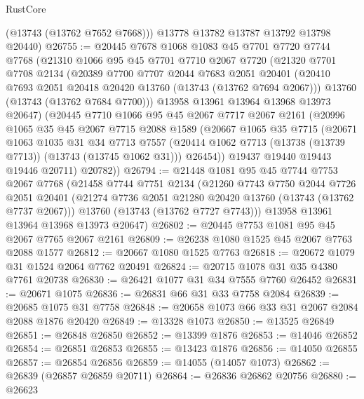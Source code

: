 \begin{lexlean}{RustCore}
\begin{coremodule}
        (@13743 (@13762 @7652 @7668)))
      @13778
      @13782
      @13787
      @13792
      @13798
      @20440)
@26755 := @20445
    @7678
    @1068
    @1083
    @45
    @7701
    @7720
    @7744
    @7768
    (@21310
      @1066
      @95
      @45
      @7701
      @7710
      @2067
      @7720
      (@21320
        @7701
        @7708
        @2134
        (@20389
          @7700
          @7707
          @2044
          @7683
          @2051
          @20401
          (@20410 @7693 @2051 @20418 @20420 @13760 (@13743 (@13762 @7694 @2067)))
          @13760
          (@13743 (@13762 @7684 @7700)))
        @13958
        @13961
        @13964
        @13968
        @13973
        @20647)
      (@20445
        @7710
        @1066
        @95
        @45
        @2067
        @7717
        @2067
        @2161
        (@20996
          @1065
          @35
          @45
          @2067
          @7715
          @2088
          @1589
          (@20667
            @1065
            @35
            @7715
            (@20671
              @1063
              @1035
              @31
              @34
              @7713
              @7557
              (@20414 @1062 @7713 (@13738 (@13739 @7713)) (@13743 (@13745 @1062 @31)))
              @26454))
          @19437
          @19440
          @19443
          @19446
          @20711)
        @20782))
@26794 := @21448
    @1081
    @95
    @45
    @7744
    @7753
    @2067
    @7768
    (@21458
      @7744
      @7751
      @2134
      (@21260
        @7743
        @7750
        @2044
        @7726
        @2051
        @20401
        (@21274 @7736 @2051 @21280 @20420 @13760 (@13743 (@13762 @7737 @2067)))
        @13760
        (@13743 (@13762 @7727 @7743)))
      @13958
      @13961
      @13964
      @13968
      @13973
      @20647)
@26802 := @20445 @7753 @1081 @95 @45 @2067 @7765 @2067 @2161
@26809 := @26238 @1080 @1525 @45 @2067 @7763 @2088 @1577
@26812 := @20667 @1080 @1525 @7763
@26818 := @20672 @1079 @31 @1524 @2064 @7762 @20491
@26824 := @20715 @1078 @31 @35 @4380 @7761 @20738
@26830 := @26421 @1077 @31 @34 @7555 @7760 @26452
@26831 := @20671 @1075
@26836 := @26831 @66 @31 @33 @7758 @2084
@26839 := @20685 @1075 @31 @7758
@26848 := @20658 @1073 @66 @33 @31 @2067 @2084 @2088 @1876 @20420
@26849 := @13328 @1073
@26850 := @13525 @26849
@26851 := @26848 @26850
@26852 := @13399 @1876
@26853 := @14046 @26852
@26854 := @26851 @26853
@26855 := @13423 @1876
@26856 := @14050 @26855
@26857 := @26854 @26856
@26859 := @14055 (@14057 @1073)
@26862 := @26839 (@26857 @26859 @20711)
@26864 := @26836 @26862 @20756
@26880 := @26623

\end{coremodule}
\end{lexlean}

